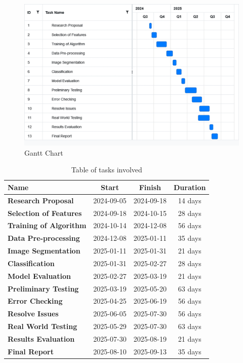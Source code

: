 \documentclass[a4paper, 12pt]{article}
\begin{document}
\begin{figure}[!ht]
    \centering
    \includegraphics[width=1\linewidth]{gantt.png}
    \caption{Gantt Chart}
    \label{gantt:1}
\end{figure}

\begin{table}[!ht]
    \centering
    \begin{tabular}{|l|c|c|c|}
    \hline
        \textbf{Name} & \textbf{Start} & \textbf{Finish} & \textbf{Duration} \\ \hline
        \textbf{Research Proposal} & 2024-09-05 & 2024-09-18 & 14 days \\ \hline
        \textbf{Selection of Features } & 2024-09-18 & 2024-10-15 & 28 days \\ \hline
        \textbf{Training of Algorithm} & 2024-10-14 & 2024-12-08 & 56 days \\ \hline
        \textbf{Data Pre-processing} & 2024-12-08 & 2025-01-11 & 35 days \\ \hline
        \textbf{Image Segmentation} & 2025-01-11 & 2025-01-31 & 21 days \\ \hline
        \textbf{Classification} & 2025-01-31 & 2025-02-27 & 28 days \\ \hline
        \textbf{Model Evaluation} & 2025-02-27 & 2025-03-19 & 21 days \\ \hline
        \textbf{Preliminary Testing} & 2025-03-19 & 2025-05-20 & 63 days \\ \hline
        \textbf{Error Checking} & 2025-04-25 & 2025-06-19 & 56 days \\ \hline
        \textbf{Resolve Issues} & 2025-06-05 & 2025-07-30 & 56 days \\ \hline
        \textbf{Real World Testing} & 2025-05-29 & 2025-07-30 & 63 days \\ \hline
        \textbf{Results Evaluation} & 2025-07-30 & 2025-08-19 & 21 days \\ \hline
        \textbf{Final Report} & 2025-08-10 & 2025-09-13 & 35 days \\ \hline
    \end{tabular}
    \caption{Table of tasks involved}
    \label{table:1}
\end{table}
\end{document}
